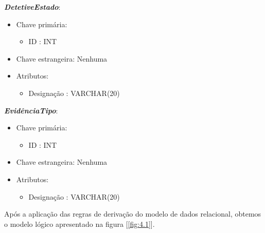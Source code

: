 \documentclass[a4paper,12pt]{scrreprt}
\begin{document}
        \clearpage
        
        \textbf{\textit{DetetiveEstado}}:
        \begin{itemize}
            \item Chave primária:
                \begin{itemize}
                    \item ID : INT
                \end{itemize}
            \item Chave estrangeira: Nenhuma
            \item Atributos:
                \begin{itemize}
                    \item Designação : VARCHAR(20)
                \end{itemize}
        \end{itemize}

        \vspace{0.5cm}
        
        \textbf{\textit{EvidênciaTipo}}:
        \begin{itemize}
            \item Chave primária:
                \begin{itemize}
                    \item ID : INT
                \end{itemize}
            \item Chave estrangeira: Nenhuma
            \item Atributos:
                \begin{itemize}
                    \item Designação : VARCHAR(20)
                \end{itemize}
        \end{itemize}

    \vspace{1cm}

    Após a aplicação das regras de derivação do modelo de dados relacional, obtemos o modelo lógico apresentado na figura [\ref{fig:4.1}].
\end{document}
